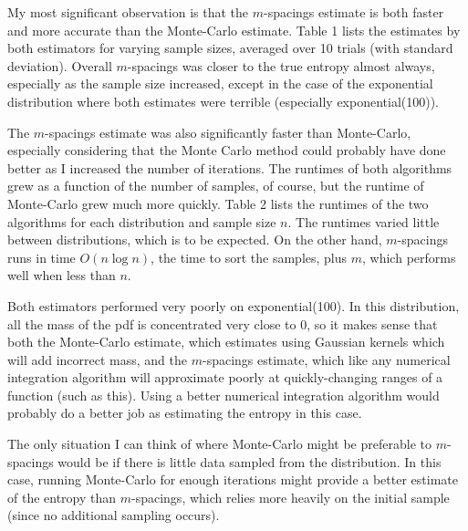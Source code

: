 \documentclass[12pt]{article}
\begin{document}
My most significant observation is that the $m$-spacings estimate is both faster and more accurate than the Monte-Carlo estimate. Table 1 lists the estimates by both estimators for varying sample sizes, averaged over 10 trials (with standard deviation). Overall $m$-spacings was closer to the true entropy almost always, especially as the sample size increased, except in the case of the exponential distribution where both estimates were terrible (especially exponential(100)). 

The $m$-spacings estimate was also significantly faster than Monte-Carlo, especially considering that the Monte Carlo method could probably have done better as I increased the number of iterations. The runtimes of both algorithms grew as a function of the number of samples, of course, but the runtime of Monte-Carlo grew much more quickly. Table 2 lists the runtimes of the two algorithms for each distribution and sample size $n$. The runtimes varied little between distributions, which is to be expected. On the other hand, $m$-spacings runs in time $O(n\log n)$, the time to sort the samples, plus $m$, which performs well when less than $n$. 

Both estimators performed very poorly on exponential(100). In this distribution, all the mass of the pdf is concentrated very close to 0, so it makes sense that both the Monte-Carlo estimate, which estimates using Gaussian kernels which will add incorrect mass, and the $m$-spacings estimate, which like any numerical integration algorithm will approximate poorly at quickly-changing ranges of a function (such as this). Using a better numerical integration algorithm would probably do a better job as estimating the entropy in this case.

The only situation I can think of where Monte-Carlo might be preferable to $m$-spacings would be if there is little data sampled from the distribution. In this case, running Monte-Carlo for enough iterations might provide a better estimate of the entropy than $m$-spacings, which relies more heavily on the initial sample (since no additional sampling occurs).
\end{document}
